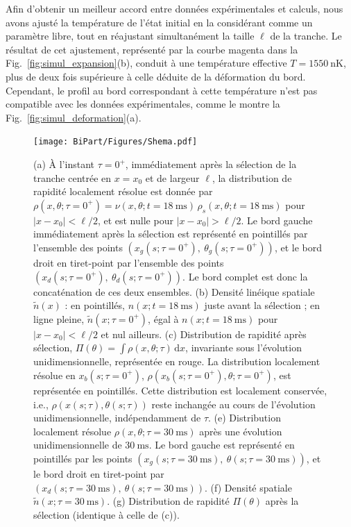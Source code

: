 Afin d’obtenir un meilleur accord entre données expérimentales et calculs, nous avons ajusté la température de l’état initial en la considérant comme un paramètre libre, tout en réajustant simultanément la taille \(\ell\) de la tranche.  
Le résultat de cet ajustement, représenté par la courbe magenta dans la Fig.~\ref{fig:simul_expansion}(b), conduit à une température effective \(T = 1550~\mathrm{nK}\), plus de deux fois supérieure à celle déduite de la déformation du bord.  
Cependant, le profil au bord correspondant à cette température n’est pas compatible avec les données expérimentales, comme le montre la Fig.~\ref{fig:simul_deformation}(a).

\medskip

\begin{figure}[!htb]
	\centering
	\texttt{[image: BiPart/Figures/Shema.pdf]}
	\caption{
(a) À l'instant $\tau = 0^+$, immédiatement après la sélection de la tranche centrée en $x = x_0$ et de largeur $\ell$, la distribution de rapidité localement résolue est donnée par $\rho(x,\theta ; \tau = 0^+) = \nu(x, \theta ; t = 18~\mathrm{ms}) \, \rho_s(x,\theta ; t = 18~\mathrm{ms})$ pour $\vert x - x_0 \vert < \ell/2$, et est nulle pour $\vert x - x_0 \vert > \ell/2$. Le bord gauche immédiatement après la sélection est représenté en pointillés par l’ensemble des points $(x_g(s; \tau = 0^+),\ \theta_g(s; \tau = 0^+))$, et le bord droit en tiret-point par l’ensemble des points $(x_d(s; \tau = 0^+),\ \theta_d(s; \tau = 0^+))$. Le bord complet est donc la concaténation de ces deux ensembles. 
(b) Densité linéique spatiale $\tilde{n}(x)$ : en pointillés, $n(x; t = 18~\mathrm{ms})$ juste avant la sélection ; en ligne pleine, $\tilde{n}(x; \tau = 0^+)$, égal à $n(x; t = 18~\mathrm{ms})$ pour $\vert x - x_0 \vert < \ell/2$ et nul ailleurs. 
(c) Distribution de rapidité après sélection, $\Pi(\theta) = \int \rho(x,\theta ; \tau)\,\mathrm{d}x$, invariante sous l’évolution unidimensionnelle, représentée en rouge. La distribution localement résolue en $x_b(s; \tau = 0^+)$, $\rho(x_b(s; \tau = 0^+), \theta ; \tau = 0^+)$, est représentée en pointillés. Cette distribution est localement conservée, i.e., $\rho(x(s; \tau), \theta(s; \tau))$ reste inchangée au cours de l’évolution unidimensionnelle, indépendamment de $\tau$. 
(e) Distribution localement résolue $\rho(x, \theta ; \tau = 30~\mathrm{ms})$ après une évolution unidimensionnelle de $30~\mathrm{ms}$. Le bord gauche est représenté en pointillés par les points $(x_g(s; \tau = 30~\mathrm{ms}),\ \theta(s; \tau = 30~\mathrm{ms}))$, et le bord droit en tiret-point par $(x_d(s; \tau = 30~\mathrm{ms}),\ \theta(s; \tau = 30~\mathrm{ms}))$. 
(f) Densité spatiale $\tilde{n}(x; \tau = 30~\mathrm{ms})$. 
(g) Distribution de rapidité $\Pi(\theta)$ après la sélection (identique à celle de (c)).
}
	\label{fig:BiPart.coupure2}
	
\end{figure}



